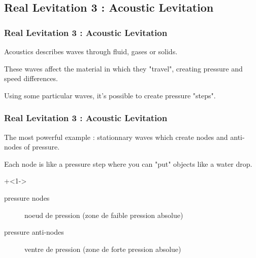 \documentclass{beamer}
\begin{document}
\subsection{Real Levitation 3 : Acoustic Levitation}
\begin{frame}
\frametitle{Real Levitation 3 : Acoustic Levitation}

Acoustics describes waves through fluid, gases or solids.

\medskip

These waves affect the material in which they "travel", creating pressure and speed differences.

\medskip

Using some particular waves, it's possible to create pressure "steps".
\end{frame}

\begin{frame}
\frametitle{Real Levitation 3 : Acoustic Levitation}
The most powerful example : stationnary waves which create nodes and anti-nodes of pressure.
\medskip


Each node is like a pressure step where you can "put" objects like a water drop.

\onslide+<1->
\begin{description} 
    \item[pressure nodes] noeud de pression (zone de faible pression absolue)
    \item[pressure anti-nodes] ventre de pression (zone de forte pression absolue)
\end{description}
\end{frame}
\end{document}
